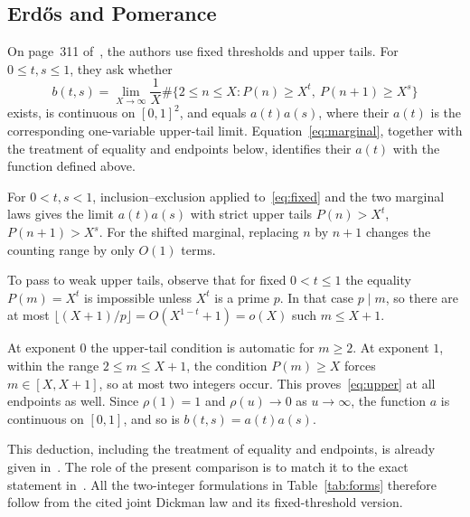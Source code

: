 \documentclass[11pt,a4paper]{amsart}
\begin{document}
\subsection{Erd\H{o}s and Pomerance}
On page~311 of~\cite{ErdosPomerance1978}, the authors use fixed
thresholds and upper tails. For $0\le t,s\le1$, they ask whether
\begin{equation}\label{eq:upper}
 b(t,s)=\lim_{X\to\infty}\frac1X
 \#\{2\le n\le X:P(n)\ge X^t,\ P(n+1)\ge X^s\}
\end{equation}
exists, is continuous on $[0,1]^2$, and equals $a(t)a(s)$, where their
$a(t)$ is the corresponding one-variable upper-tail limit.
Equation~\eqref{eq:marginal}, together with the treatment of equality and
endpoints below, identifies their $a(t)$ with the function defined above.

For $0<t,s<1$, inclusion--exclusion applied to~\eqref{eq:fixed} and the
two marginal laws gives the limit $a(t)a(s)$ with strict upper tails
$P(n)>X^t$, $P(n+1)>X^s$. For the shifted marginal, replacing $n$ by
$n+1$ changes the counting range by only $O(1)$ terms.

To pass to weak upper tails, observe that for fixed $0<t\le1$ the
equality $P(m)=X^t$ is
impossible unless $X^t$ is a prime $p$. In that case $p\mid m$, so
there are at most $\lfloor(X+1)/p\rfloor=O(X^{1-t}+1)=o(X)$ such
$m\le X+1$.

At exponent $0$ the upper-tail condition is automatic for $m\ge2$.
At exponent $1$, within the range $2\le m\le X+1$, the condition
$P(m)\ge X$ forces $m\in[X,X+1]$, so at most two integers occur.
This proves~\eqref{eq:upper} at all
endpoints as well.
Since $\rho(1)=1$ and $\rho(u)\to0$ as $u\to\infty$, the function $a$
is continuous on $[0,1]$, and so is $b(t,s)=a(t)a(s)$.

This deduction, including the treatment of equality and endpoints, is
already given in~\cite[(11.8) and following paragraph, p.~80]{OpenAI2026}.
The role of the present comparison is to match it to the exact statement
in~\cite{ErdosPomerance1978}. All the two-integer formulations in
Table~\ref{tab:forms} therefore follow from the cited joint Dickman law
and its fixed-threshold version.
\end{document}
